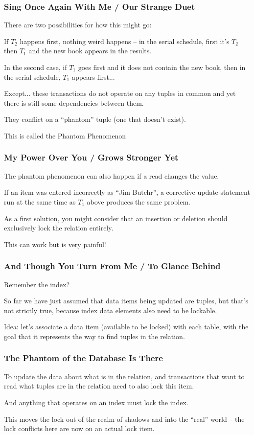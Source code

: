 \begin{frame}
\frametitle{Sing Once Again With Me / Our Strange Duet}

There are two possibilities for how this might go: 


If $T_{2}$ happens first, nothing weird happens -- in the serial schedule, first it's $T_{2}$ then $T_{1}$ and the new book appears in the results. 

In the second case, if $T_{1}$ goes first and it does not contain the new book, then in the serial schedule, $T_{1}$ appears first... 

Except... these transactions do not operate on any tuples in common and yet there is still some dependencies between them. 

They conflict on a ``phantom'' tuple (one that doesn't exist). 

This is called the \alert{Phantom Phenomenon}

\end{frame}

\begin{frame}
\frametitle{My Power Over You / Grows Stronger Yet}
The phantom phenomenon can also happen if a read changes the value. 

If an item was entered incorrectly as ``Jim Butchr'', a corrective update statement run at the same time as $T_{1}$ above produces the same problem.

As a first solution, you might consider that an insertion or deletion should exclusively lock the relation entirely.

This can work but is very painful!

\end{frame}

\begin{frame}
\frametitle{And Though You Turn From Me / To Glance Behind}

Remember the index? 

So far we have just assumed that data items being updated are tuples, but that's not strictly true, because index data elements also need to be lockable.

Idea: let's associate a data item (available to be locked) with each table, with the goal that it represents the way to find tuples in the relation.

\end{frame}


\begin{frame}
\frametitle{The Phantom of the Database Is There}

To update the data about what is in the relation, and transactions that want to read what tuples are in the relation need to also lock this item. 

And anything that operates on an index must lock the index. 

This moves the lock out of the realm of shadows and into the ``real'' world -- the lock conflicts here are now on an actual lock item.


\end{frame}

